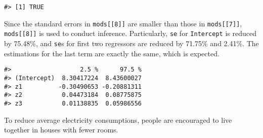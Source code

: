 \documentclass[main.tex]{subfiles}
\begin{document}
\begin{verbatim}
#> [1] TRUE
\end{verbatim}

Since the standard errors in \texttt{mods{[}{[}8{]}{]}} are smaller than
those in \texttt{mods{[}{[}7{]}{]}}, \texttt{mods{[}{[}8{]}{]}} is used
to conduct inference. Particularly, \texttt{se} for \texttt{Intercept}
is reduced by 75.48\%, and \texttt{se}s for first two regressors are
reduced by 71.75\% and 2.41\%. The estimations for the last term are
exactly the same, which is expected.

\begin{verbatim}
#>                   2.5 %      97.5 %
#> (Intercept)  8.30417224  8.43600027
#> z1          -0.30490653 -0.20881311
#> z2           0.04473184  0.08775875
#> z3           0.01138835  0.05986556
\end{verbatim}

To reduce average electricity consumptions, people are encouraged to
live together in houses with fewer rooms.
\end{document}
